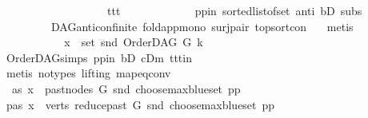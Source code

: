 \begin{isabellebody}
\ \ \ \ \ \ \ \ \ \ \ \ \ \ \ \ \ \ \ ttt{\isacharparenright}{\kern0pt}{\isacharparenright}{\kern0pt}{\isachardoublequoteclose}\ \isanewline
\ \ \ \ \ \ \ \ \ \ \isamarkupfalse%
\ pp{\isacharunderscore}{\kern0pt}in\ sorted{\isacharunderscore}{\kern0pt}list{\isacharunderscore}{\kern0pt}of{\isacharunderscore}{\kern0pt}set{\isacharparenleft}{\kern0pt}{}{\isacharparenright}{\kern0pt}\ anti\ bD\ subs\isanewline
\ \ \ \ \ \ \ \ \ DAG{\isachardot}{\kern0pt}anticon{\isacharunderscore}{\kern0pt}finite\ fold{\isacharunderscore}{\kern0pt}app{\isacharunderscore}{\kern0pt}mono{}\ surj{\isacharunderscore}{\kern0pt}pair\ top{\isacharunderscore}{\kern0pt}sort{\isacharunderscore}{\kern0pt}con\ \ \isamarkupfalse%
\ metis\ \isanewline
\ \ \ \ \ \ \ \ \isamarkupfalse%
\ \isamarkupfalse%
\ {\isachardoublequoteopen}x\ {\isasymin}\ set\ {\isacharparenleft}{\kern0pt}snd\ {\isacharparenleft}{\kern0pt}OrderDAG\ G\ k{\isacharparenright}{\kern0pt}{\isacharparenright}{\kern0pt}{\isachardoublequoteclose}\ \isamarkupfalse%
\ OrderDAG{\isachardot}{\kern0pt}simps\ pp{\isacharunderscore}{\kern0pt}in\ bD\ cDm\ ttt{\isacharunderscore}{\kern0pt}in\ {}\isanewline
\ \ \ \ \ \ \ \ \ \ \isamarkupfalse%
\ {\isacharparenleft}{\kern0pt}metis\ {\isacharparenleft}{\kern0pt}no{\isacharunderscore}{\kern0pt}types{\isacharcomma}{\kern0pt}\ lifting{\isacharparenright}{\kern0pt}\ map{\isacharunderscore}{\kern0pt}eq{\isacharunderscore}{\kern0pt}conv{\isacharparenright}{\kern0pt}\ \isanewline
\ \ \ \ \ \ \isamarkupfalse%
\ \isanewline
\ \ \ \ \ \ \ \ \isamarkupfalse%
\ \ as{}{\isacharcolon}{\kern0pt}\ {\isachardoublequoteopen}x\ {\isasymin}\ past{\isacharunderscore}{\kern0pt}nodes\ G\ {\isacharparenleft}{\kern0pt}snd\ {\isacharparenleft}{\kern0pt}choose{\isacharunderscore}{\kern0pt}max{\isacharunderscore}{\kern0pt}blue{\isacharunderscore}{\kern0pt}set\ pp{\isacharparenright}{\kern0pt}{\isacharparenright}{\kern0pt}{\isachardoublequoteclose}\isanewline
\ \ \ \ \ \ \ \ \isamarkupfalse%
\ \isamarkupfalse%
\ pas{\isacharcolon}{\kern0pt}\ {\isachardoublequoteopen}x\ {\isasymin}\ verts\ {\isacharparenleft}{\kern0pt}reduce{\isacharunderscore}{\kern0pt}past\ G\ {\isacharparenleft}{\kern0pt}snd\ {\isacharparenleft}{\kern0pt}choose{\isacharunderscore}{\kern0pt}max{\isacharunderscore}{\kern0pt}blue{\isacharunderscore}{\kern0pt}set\ pp{\isacharparenright}{\kern0pt}{\isacharparenright}{\kern0pt}{\isacharparenright}{\kern0pt}{\isachardoublequoteclose}\ \isanewline

\end{isabellebody}
